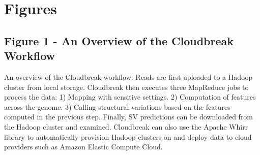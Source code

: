 \documentclass[10pt]{bmc_article}
\newenvironment{bmcformat}{\fussy\setboolean{publ}{true}}{\fussy}
\begin{document}
\begin{bmcformat}


{
   }     %





\section*{Figures}
  \subsection*{Figure 1 - An Overview of the Cloudbreak Workflow}
An overview of the Cloudbreak workflow. Reads are first uploaded to a Hadoop cluster from local storage. Cloudbreak then executes three MapReduce jobs to process the data: 1) Mapping with sensitive settings. 2) Computation of features across the genome. 3) Calling structural variations based on the features computed in the previous step. Finally, SV predictions can be downloaded from the Hadoop cluster and examined. Cloudbreak can also use the Apache Whirr library to automatically provision Hadoop clusters on and deploy data to cloud providers such as Amazon Elastic Compute Cloud.


\end{bmcformat}
\end{document}
